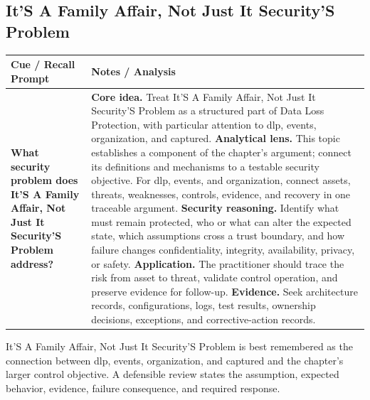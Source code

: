 \documentclass[11pt]{article}
\newcommand{\CornellHeader}{%
\rowcolor{Navy}\color{white}\bfseries Cue / Recall Prompt & \color{white}\bfseries Notes / Analysis\\\hline}
\newcommand{\CornellRow}[2]{%
\cellcolor{CueGray}\RaggedRight\textbf{#1} & \RaggedRight #2\\\hline}
\begin{document}
\subsection*{It'S A Family Affair, Not Just It Security'S Problem}
\begin{longtable}{>{\RaggedRight\arraybackslash}p{}|>{\RaggedRight\arraybackslash}p{}}
\CornellHeader
\CornellRow{What security problem does It'S A Family Affair, Not Just It Security'S Problem address?}{\textbf{Core idea.} Treat It'S A Family Affair, Not Just It Security'S Problem as a structured part of Data Loss Protection, with particular attention to dlp, events, organization, and captured. \textbf{Analytical lens.} This topic establishes a component of the chapter's argument; connect its definitions and mechanisms to a testable security objective. For dlp, events, and organization, connect assets, threats, weaknesses, controls, evidence, and recovery in one traceable argument. \textbf{Security reasoning.} Identify what must remain protected, who or what can alter the expected state, which assumptions cross a trust boundary, and how failure changes confidentiality, integrity, availability, privacy, or safety. \textbf{Application.} The practitioner should trace the risk from asset to threat, validate control operation, and preserve evidence for follow-up. \textbf{Evidence.} Seek architecture records, configurations, logs, test results, ownership decisions, exceptions, and corrective-action records.}
\end{longtable}
\begin{topicsummary}
It'S A Family Affair, Not Just It Security'S Problem is best remembered as the connection between dlp, events, organization, and captured and the chapter's larger control objective. A defensible review states the assumption, expected behavior, evidence, failure consequence, and required response.
\end{topicsummary}
\end{document}

